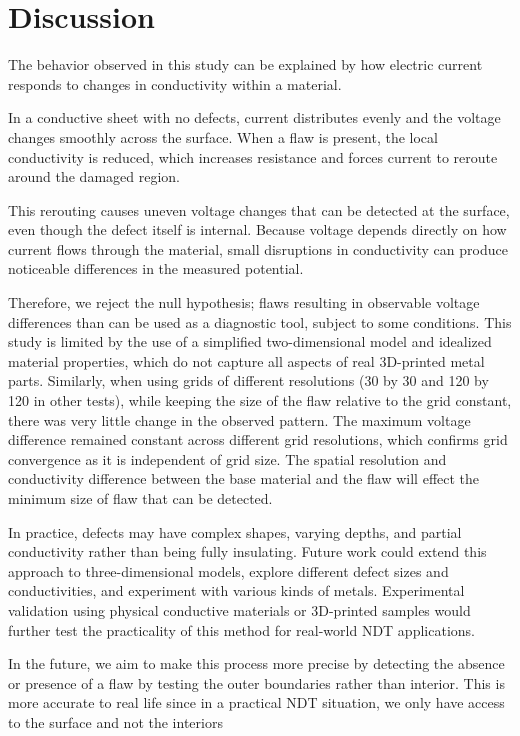 \documentclass[10pt,journal,twoside]{IEEEtran} %
\begin{document}
\section{Discussion}
The behavior observed in this study can be explained by how electric current responds to changes in conductivity within a material.

In a conductive sheet with no defects, current distributes evenly and the voltage changes smoothly across the surface. When a flaw is present, the local conductivity is reduced, which increases resistance and forces current to reroute around the damaged region. 

This rerouting causes uneven voltage changes that can be detected at the surface, even though the defect itself is internal. Because voltage depends directly on how current flows through the material, small disruptions in conductivity can produce noticeable differences in the measured potential. 

Therefore, we reject the null hypothesis; flaws resulting in observable voltage differences than can be used as a diagnostic tool, subject to some conditions. This study is limited by the use of a simplified two-dimensional model and idealized material properties, which do not capture all aspects of real 3D-printed metal parts. Similarly, when using grids of different resolutions (30 by 30 and 120 by 120 in other tests), while keeping the size of the flaw relative to the grid constant, there was very little change in the observed pattern. The maximum voltage difference remained constant across different grid resolutions, which confirms grid convergence as it is independent of grid size. The spatial resolution and conductivity difference between the base material and the flaw will effect the minimum size of flaw that can be detected. 

In practice, defects may have complex shapes, varying depths, and partial conductivity rather than being fully insulating. Future work could extend this approach to three-dimensional models, explore different defect sizes and conductivities, and experiment with various kinds of metals. Experimental validation using physical conductive materials or 3D-printed samples would further test the practicality of this method for real-world NDT applications. 

In the future, we aim to make this process more precise by detecting the absence or presence of a flaw by testing the outer boundaries rather than interior. This is more accurate to real life since in a practical NDT situation, we only have access to the surface and not the interiors
\end{document}
